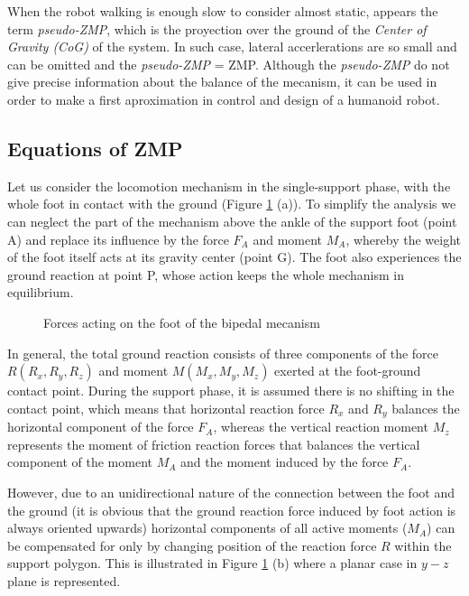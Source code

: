 When the robot walking is enough slow to consider almost static, appears the term \textit{pseudo-ZMP}, which is the proyection over the ground of the \textit{Center of Gravity (CoG)} of the system. In such case, lateral accerlerations are so small and can be omitted and the \textit{pseudo-ZMP} = ZMP. Although the \textit{pseudo-ZMP} do not give precise information about the balance of the mecanism, it can be used in order to make a first aproximation in control and design of a humanoid robot.



\subsection{Equations of ZMP}
Let us consider the locomotion mechanism in the single-support phase, with the whole foot in contact with the ground (Figure \ref{fig:pie} (a)). To simplify the analysis we can neglect the part of the mechanism above the ankle of the support foot (point A) and replace its influence by the force $F_A$ and moment $M_A$, whereby the weight of the foot itself acts at its gravity center (point G). The foot also experiences the ground reaction at point P, whose action keeps the whole mechanism in equilibrium.

\begin{figure}[!hbt]
\centering
{}
\caption{Forces acting on the foot of the bipedal mecanism \protect\cite{Vuk2004} }
\label{fig:pie}
\end{figure}

In general, the total ground reaction consists of three components of the force $R (R_x, R_y, R_z)$ and moment $M (M_x, M_y, M_z)$ exerted at the foot-ground contact point. During the support phase, it is assumed there is no shifting in the contact point, which means that horizontal reaction force $R_x$ and $R_y$ balances the horizontal component of the force $F_A$, whereas the vertical reaction moment $M_z$ represents the moment of friction reaction forces that balances the vertical component of the moment $M_A$ and the moment induced by the force $F_A$.

However, due to an unidirectional nature of the connection between the foot and the ground (it is obvious that the ground reaction force induced by foot action is always oriented upwards) horizontal components of all active moments ($M_A$) can be compensated for only by changing position of the reaction force $R$ within the support polygon. This is illustrated in Figure \ref{fig:pie} (b) where a planar case in $y-z$ plane is represented.

